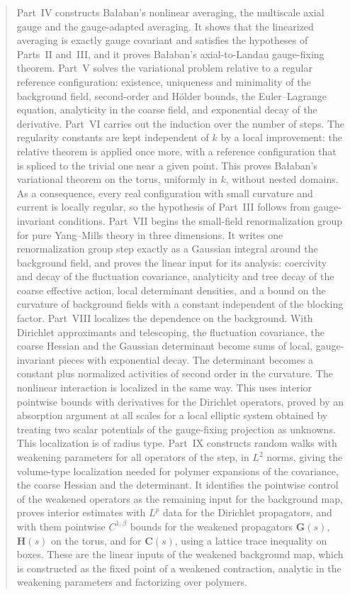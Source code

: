 \documentclass[11pt,a4paper]{article}
\numberwithin{equation}{section}
\theoremstyle{definition}
\theoremstyle{remark}
\newcommand{\bG}{\mathbf G}
\newcommand{\bH}{\mathbf H}
\newcommand{\bC}{\mathbf C}
\begin{document}
\begin{abstract}
Part~IV constructs Ba\l aban's nonlinear averaging, the multiscale axial gauge and the gauge-adapted averaging. It shows that the linearized averaging is exactly gauge covariant and satisfies the hypotheses of Parts~II and~III, and it proves Ba\l aban's axial-to-Landau gauge-fixing theorem. Part~V solves the variational problem relative to a regular reference configuration: existence, uniqueness and minimality of the background field, second-order and H\"older bounds, the Euler--Lagrange equation, analyticity in the coarse field, and exponential decay of the derivative. Part~VI carries out the induction over the number of steps. The regularity constants are kept independent of $k$ by a local improvement: the relative theorem is applied once more, with a reference configuration that is spliced to the trivial one near a given point. This proves Ba\l aban's variational theorem on the torus, uniformly in $k$, without nested domains. As a consequence, every real configuration with small curvature and current is locally regular, so the hypothesis of Part~III follows from gauge-invariant conditions. Part~VII begins the small-field renormalization group for pure Yang--Mills theory in three dimensions. It writes one renormalization group step exactly as a Gaussian integral around the background field, and proves the linear input for its analysis: coercivity and decay of the fluctuation covariance, analyticity and tree decay of the coarse effective action, local determinant densities, and a bound on the curvature of background fields with a constant independent of the blocking factor. Part~VIII localizes the dependence on the background. With Dirichlet approximants and telescoping, the fluctuation covariance, the coarse Hessian and the Gaussian determinant become sums of local, gauge-invariant pieces with exponential decay. The determinant becomes a constant plus normalized activities of second order in the curvature. The nonlinear interaction is localized in the same way. This uses interior pointwise bounds with derivatives for the Dirichlet operators, proved by an absorption argument at all scales for a local elliptic system obtained by treating two scalar potentials of the gauge-fixing projection as unknowns. This localization is of radius type. Part~IX constructs random walks with weakening parameters for all operators of the step, in $L^2$ norms, giving the volume-type localization needed for polymer expansions of the covariance, the coarse Hessian and the determinant. It identifies the pointwise control of the weakened operators as the remaining input for the background map, proves interior estimates with $L^p$ data for the Dirichlet propagators, and with them pointwise $C^{1,\beta}$ bounds for the weakened propagators $\bG(s)$, $\bH(s)$ on the torus, and for $\bC(s)$, using a lattice trace inequality on boxes. These are the linear inputs of the weakened background map, which is constructed as the fixed point of a weakened contraction, analytic in the weakening parameters and factorizing over polymers.


\end{abstract}
\end{document}
